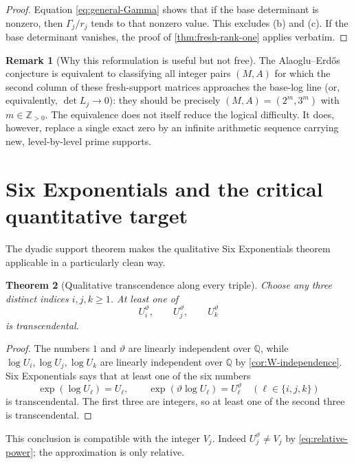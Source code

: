 \documentclass[11pt]{article}
\newtheorem{theorem}{Theorem}[section]
\theoremstyle{definition}
\newtheorem{remark}[theorem]{Remark}
\newcommand{\Q}{\mathbb Q}
\newcommand{\Z}{\mathbb Z}
\newcommand{\vtheta}{\vartheta}
\begin{document}
\begin{proof}
Equation \eqref{eq:general-Gamma} shows that if the base determinant is nonzero, then
$\Gamma_j/r_j$ tends to that nonzero value.  This excludes (b) and (c).  If the base
determinant vanishes, the proof of \cref{thm:fresh-rank-one} applies verbatim.
\end{proof}

\begin{remark}[Why this reformulation is useful but not free]
The Alaoglu--Erd\H{o}s conjecture is equivalent to classifying all integer pairs $(M,A)$
for which the second column of these fresh-support matrices approaches the base-log line
(or, equivalently, $\det L_j\to0$): they should be precisely
$(M,A)=(2^m,3^m)$ with $m\in\Z_{>0}$.  The equivalence does not itself reduce the logical
difficulty.  It does, however, replace a single exact zero by an infinite arithmetic
sequence carrying new, level-by-level prime supports.
\end{remark}

\section{Six Exponentials and the critical quantitative target}
\label{sec:six-exp}

The dyadic support theorem makes the qualitative Six Exponentials theorem applicable in a
particularly clean way.

\begin{theorem}[Qualitative transcendence along every triple]\label{thm:six-exp-triple}
Choose any three distinct indices $i,j,k\ge1$.  At least one of
\begin{equation}\label{eq:three-powers}
 U_i^{\vtheta},\qquad U_j^{\vtheta},\qquad U_k^{\vtheta}
\end{equation}
is transcendental.
\end{theorem}

\begin{proof}
The numbers $1$ and $\vtheta$ are linearly independent over $\Q$, while
$\log U_i,\log U_j,\log U_k$ are linearly independent over $\Q$ by
\cref{cor:W-independence}.  Six Exponentials says that at least one of the six numbers
\[
 \exp(\log U_\ell)=U_\ell,
 \qquad
 \exp(\vtheta\log U_\ell)=U_\ell^{\vtheta}
 \quad(\ell\in\{i,j,k\})
\]
is transcendental.  The first three are integers, so at least one of the second three is
transcendental.
\end{proof}

This conclusion is compatible with the integer $V_j$.  Indeed
$U_j^{\vtheta}\ne V_j$ by \eqref{eq:relative-power}; the approximation is only relative.
\end{document}
